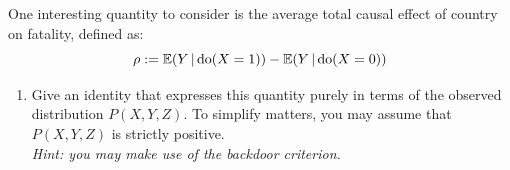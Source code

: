 One interesting quantity to consider is the
average total causal effect of country on fatality, defined as:
$$\rho := \mathbb{E}(Y \operatorname*{|} \operatorname{do}(X=1)) - \mathbb{E}(Y \operatorname*{|} \operatorname{do}(X=0))$$

\begin{enumerate}[resume*]
  \item Give an identity that expresses this quantity purely in terms of the observed distribution $P(X,Y,Z)$.
    To simplify matters, you may assume that $P(X,Y,Z)$ is strictly positive.\\
    \emph{Hint: you may make use of the backdoor criterion.}
\end{enumerate}

